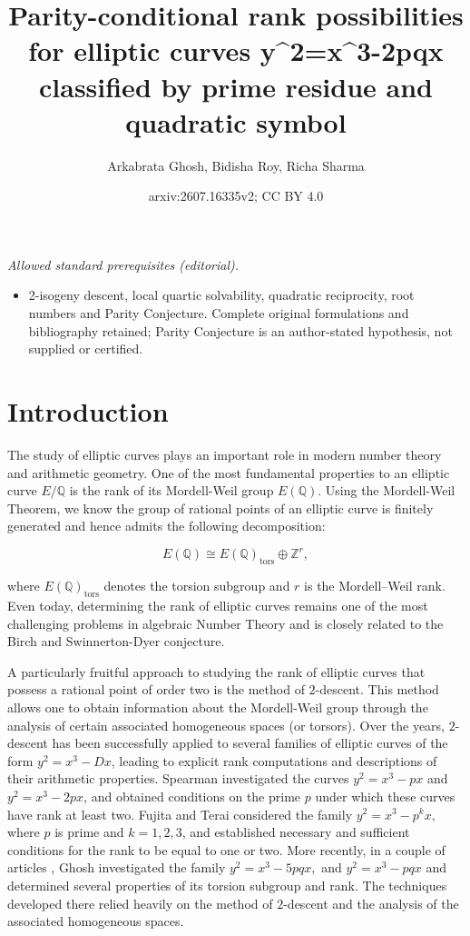 \documentclass[12pt]{amsart}
\title{Parity-conditional rank possibilities for elliptic curves y\textasciicircum{}2=x\textasciicircum{}3-2pqx classified by prime residue and quadratic symbol}
\author{Arkabrata Ghosh, Bidisha Roy, Richa Sharma}
\date{arxiv:2607.16335v2; CC BY 4.0}
\numberwithin{equation}{section}
\theoremstyle{definition}
\begin{document}
\maketitle
\noindent\textit{Allowed standard prerequisites (editorial).}\begin{itemize}
\item 2-isogeny descent, local quartic solvability, quadratic reciprocity, root numbers and Parity Conjecture. Complete original formulations and bibliography retained; Parity Conjecture is an author-stated hypothesis, not supplied or certified.
\end{itemize}\medskip
\section{Introduction}


The study of elliptic curves plays an important role in modern number theory and arithmetic geometry. One of the most fundamental properties to an elliptic curve $E/\mathbb{Q}$ is the rank of its Mordell-Weil group $E(\mathbb{Q})$. Using the Mordell-Weil Theorem, we know the group of rational points of an elliptic curve is finitely generated and hence admits the following decomposition:

$$
E(\mathbb{Q}) \cong E(\mathbb{Q})_{\mathrm{tors}} \oplus \mathbb{Z}^{r},
$$

where $E(\mathbb{Q})_{\mathrm{tors}}$ denotes the torsion subgroup and $r$ is the Mordell--Weil rank. Even today, determining the rank of elliptic curves remains one of the most challenging problems in algebraic Number Theory and is closely related to the Birch and Swinnerton-Dyer conjecture.

A particularly fruitful approach to studying the rank of elliptic curves that possess a rational point of order two is the method of $2$-descent. This method allows one to obtain information about the Mordell-Weil group through the analysis of certain associated homogeneous spaces (or torsors). Over the years, $2$-descent has been successfully applied to several families of elliptic curves of the form $y^2=x^3-Dx$, leading to explicit rank computations and descriptions of their arithmetic properties. Spearman \cite{Sp07,Sp07_1} investigated the curves $ y^2=x^3-px$ and $y^2=x^3-2px$, and obtained conditions on the prime $p$ under which these curves have rank at least two. Fujita and Terai \cite{FT11} considered the family
$
y^2=x^3-p^k x,
$
where $p$ is prime and $k=1,2,3$, and established necessary and sufficient conditions for the rank to be equal to one or two. More recently, in a couple of articles \cite{Gh25, Gh26}, Ghosh  investigated the family
$
y^2=x^3-5pqx,
$
and
$
y^2=x^3-pqx
$
and determined several properties of its torsion subgroup and rank. The techniques developed there relied heavily on the method of $2$-descent and the analysis of the associated homogeneous spaces.
\end{document}
